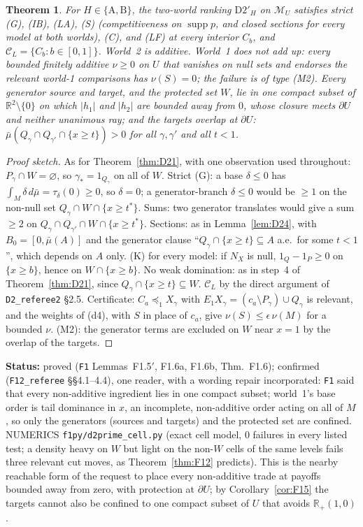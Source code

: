 \documentclass[11pt]{article}
\newtheorem{theorem}{Theorem}[section]
\theoremstyle{definition}
\theoremstyle{remark}
\newcommand{\R}{\mathbb R}
\newcommand{\M}{\mathcal M}
\newcommand{\C}{\mathcal C}
\newcommand{\supp}{\operatorname{supp}}
\newcommand{\src}[1]{\texttt{#1}}
\newcommand{\status}[1]{\par\smallskip\noindent\textbf{Status:} #1\par\smallskip}
\begin{document}
\begin{theorem}\label{thm:F16}
For $H\in\{\mathrm A,\mathrm B\}$, the two-world ranking $\mathrm{D2}'_H$ on $\M_U$ satisfies strict (G), (IB), (LA), (S) (competitiveness on $\supp p$, and closed sections for every model at both worlds), (C), and (LF) at every interior $C_b$, and $\C_L=\{C_b:b\in[0,1]\}$. World~2 is additive. World~1 does not add up: every bounded finitely additive $\nu\ge0$ on $U$ that vanishes on null sets and endorses the relevant world-1 comparisons has $\nu(S)=0$; the failure is of type (M2). Every generator source and target, and the protected set $W$, lie in one compact subset of $\R^2\setminus\{0\}$ on which $|h_1|$ and $|h_2|$ are bounded away from $0$, whose closure meets $\partial U$ and neither unanimous ray; and the targets overlap at $\partial U$: $\bar\mu(Q_\gamma\cap Q_{\gamma'}\cap\{x\ge t\})>0$ for all $\gamma,\gamma'$ and all $t<1$.
\end{theorem}
\begin{proof}[Proof sketch]
As for Theorem~\ref{thm:D21}, with one observation used throughout: $P_\gamma\cap W=\varnothing$, so $\gamma_*=1_{Q_\gamma}$ on all of $W$. Strict (G): a base $\delta\le0$ has $\int_M\delta\,d\bar\mu=\tau_\delta(0)\ge0$, so $\delta=0$; a generator-branch $\delta\le0$ would be $\ge1$ on the non-null set $Q_\gamma\cap W\cap\{x\ge t^*\}$. Sums: two generator translates would give a sum $\ge2$ on $Q_\gamma\cap Q_{\gamma'}\cap W\cap\{x\ge t^*\}$. Sections: as in Lemma~\ref{lem:D24}, with $B_0=[0,\bar\mu(A)]$ and the generator clause ``$Q_\gamma\cap\{x\ge t\}\subseteq A$ a.e.\ for some $t<1$'', which depends on $A$ only. (K) for every model: if $N_X$ is null, $1_Q-1_P\ge0$ on $\{x\ge b\}$, hence on $W\cap\{x\ge b\}$. No weak domination: as in step~4 of Theorem~\ref{thm:D21}, since $Q_\gamma\cap\{x\ge t\}\subseteq W$. $\C_L$ by the direct argument of \src{D2\_referee2} \S2.5. Certificate: $C_a\preceq_1X_\gamma$ with $E_1X_\gamma=(c_a\setminus P_\gamma)\cup Q_\gamma$ is relevant, and the weights of (d4), with $S$ in place of $c_a$, give $\nu(S)\le\epsilon\,\nu(M)$ for a bounded $\nu$. (M2): the generator terms are excluded on $W$ near $x=1$ by the overlap of the targets.
\end{proof}
\status{proved (\src{F1} Lemmas~F1.5$'$, F1.6a, F1.6b, Thm.~F1.6); confirmed (\src{F12\_referee} \S\S4.1--4.4), one reader, with a wording repair incorporated: \src{F1} said that every non-additive ingredient lies in one compact subset; world~1's base order is tail dominance in $x$, an incomplete, non-additive order acting on all of $M$, so only the generators (sources and targets) and the protected set are confined. NUMERICS \src{f1py/d2prime\_cell.py} (exact cell model, 0 failures in every listed test; a density heavy on $W$ but light on the non-$W$ cells of the same levels fails three relevant cut moves, as Theorem~\ref{thm:F12} predicts). This is the nearby reachable form of the request to place every non-additive trade at payoffs bounded away from zero, with protection at $\partial U$; by Corollary~\ref{cor:F15} the targets cannot also be confined to one compact subset of $U$ that avoids $\R_+(1,0)$.}
\end{document}

